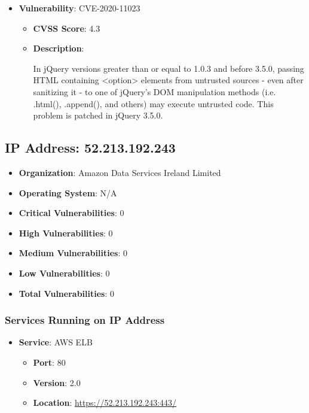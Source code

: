 \documentclass{article}
\begin{document}
\begin{itemize}
        \item \textbf{Vulnerability}: CVE-2020-11023
        \begin{itemize}
            \item \textbf{CVSS Score}:  4.3 
            \item \textbf{Description}:
            \parbox[t]{0.9\linewidth}{
                \ttfamily In jQuery versions greater than or equal to 1.0.3 and before 3.5.0, passing HTML containing <option> elements from untrusted sources - even after sanitizing it - to one of jQuery's DOM manipulation methods (i.e. .html(), .append(), and others) may execute untrusted code. This problem is patched in jQuery 3.5.0.
            }
        \end{itemize}
    
\end{itemize}




\clearpage



\subsection*{IP Address: 52.213.192.243}

\begin{itemize}
    \item \textbf{Organization}: Amazon Data Services Ireland Limited
    \item \textbf{Operating System}:  N/A 
    \item \textbf{Critical Vulnerabilities}: 0
    \item \textbf{High Vulnerabilities}: 0
    \item \textbf{Medium Vulnerabilities}: 0
    \item \textbf{Low Vulnerabilities}: 0
    \item \textbf{Total Vulnerabilities}: 0
\end{itemize}

\subsubsection*{Services Running on IP Address}

\begin{itemize}
    
        \item \textbf{Service}: AWS ELB
        \begin{itemize}
            \item \textbf{Port}: 80
            \item \textbf{Version}:  2.0 
            \item \textbf{Location}: \href{ https://52.213.192.243:443/ }{ https://52.213.192.243:443/ }
        \end{itemize}
    
\end{itemize}
\end{document}
